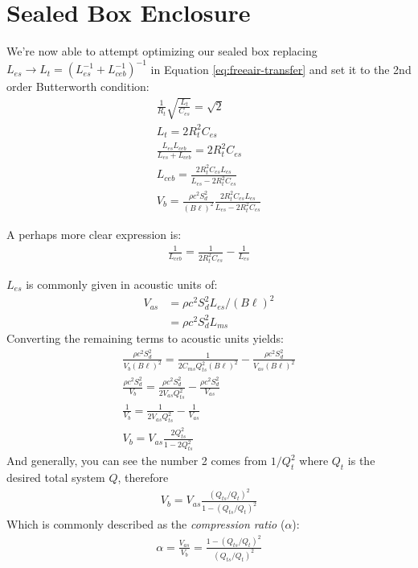 \documentclass[10pt]{book}
\begin{document}
\section{Sealed Box Enclosure} We're now able to attempt optimizing our sealed box replacing $L_{es}\rightarrow L_t=\left(L_{es}^{-1}+L_{ceb}^{-1}\right)^{-1}$ in Equation \ref{eq:freeair-transfer} and set it to the 2nd order Butterworth condition:
\begin{align}
\frac{ 1}{R_{t}}\sqrt{\frac{L_t}{C_{es}} } =\sqrt{2}\\
L_t=2R_{t}^2C_{es}\\
\frac{L_{es}L_{ceb}}{L_{es}+L_{ceb}}=2R_{t}^2C_{es}\\
L_{ceb}=\frac{2R_{t}^2C_{es}L_{es}}{L_{es}-2R_{t}^2C_{es}}\\
V_b=\frac{\rho c^2 S_d^2}{(B\ell)^2}\frac{2R_{t}^2C_{es}L_{es}}{L_{es}-2R_{t}^2C_{es}}
\end{align}

A perhaps more clear expression is:
\begin{align}
\frac{1}{L_{ceb}}=\frac{1}{2R_{t}^2C_{es}}-\frac{1}{L_{es}}
\end{align}

$L_{es}$ is commonly given in acoustic units of:
\begin{align}
V_{as}&=\rho c^2 S_d^2 L_{es}/(B\ell)^2\\
&=\rho c^2 S_d^2 L_{ms}
\end{align}
Converting the remaining terms to acoustic units yields:
\begin{align}
\frac{\rho c^2 S_d^2}{V_{b} (B\ell)^2}=\frac{1}{2C_{ms}Q_{ts}^2(B\ell)^2}
-\frac{\rho c^2 S_d^2}{V_{as} (B\ell)^2}\\
\frac{\rho c^2 S_d^2}{V_{b}}=\frac{\rho c^2 S_d^2}{2V_{as}Q_{ts}^2}
-\frac{\rho c^2 S_d^2}{V_{as}}\\
\frac{1}{V_{b}}=\frac{1}{2V_{as}Q_{ts}^2}
-\frac{1}{V_{as}}\\
V_{b}=V_{as}\frac{2Q_{ts}^2}{1-2Q_{ts}^2}
\end{align}
And generally, you can see the number 2 comes from $1/Q_t^2$ where $Q_t$ is the desired total system $Q$, therefore
\begin{align}
V_{b}=V_{as}\frac{(Q_{ts}/Q_{t})^2}{1-(Q_{ts}/Q_{t})^2}
\end{align}
Which is commonly described as the \textit{compression ratio} ($\alpha$):
\begin{align}
\alpha=\frac{V_{as}}{V_b}=\frac{1-(Q_{ts}/Q_{t})^2}{(Q_{ts}/Q_{t})^2}
\end{align}
\end{document}
